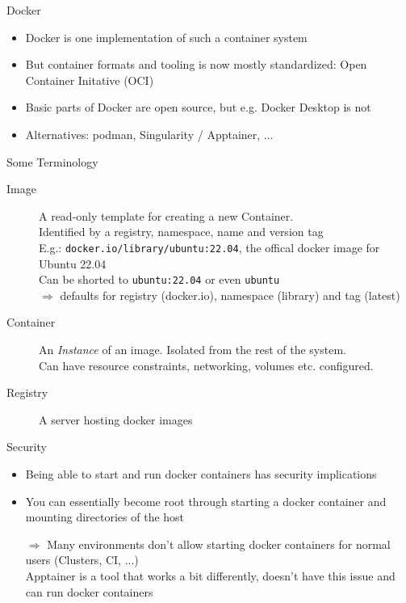 \documentclass[aspectratio=1610]{beamer}
\begin{document}
\begin{frame}{Docker}
  \begin{itemize}
    \item Docker is one implementation of such a container system
    \item But container formats and tooling is now mostly standardized: Open Container Initative (OCI)
    \item Basic parts of Docker are open source, but e.g. Docker Desktop is not
    \item Alternatives: podman, Singularity / Apptainer, ...
  \end{itemize}
\end{frame}


\begin{frame}{Some Terminology}
  \begin{description}
    \item[Image] A read-only template for creating a new Container. \\
      Identified by a registry, namespace, name and version tag \\
      E.g.: \texttt{docker.io/library/ubuntu:22.04}, the offical docker image for Ubuntu 22.04 \\
      Can be shorted to \texttt{ubuntu:22.04} or even \texttt{ubuntu} \\ $⇒$ defaults for registry (docker.io), namespace (library) and tag (latest)
    \item[Container] An \emph{Instance} of an image. Isolated from the rest of the system. \\
      Can have resource constraints, networking, volumes etc. configured.
    \item[Registry] A server hosting docker images
  \end{description}
\end{frame}

\begin{frame}{Security}
  \begin{itemize}
    \item Being able to start and run docker containers has security implications
    \item You can essentially become root through starting a docker container and mounting directories of the host
    \item[$⇒$] Many environments don't allow starting docker containers for normal users (Clusters, CI, ...) \\
      Apptainer is a tool that works a bit differently, doesn't have this issue and can run docker containers
  \end{itemize}
\end{frame}
\end{document}
